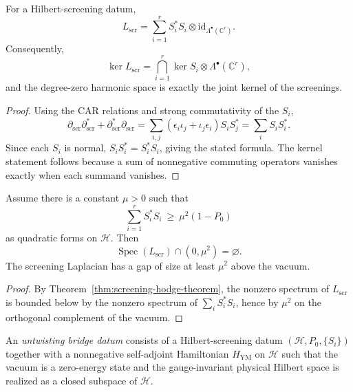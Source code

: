 \begin{theorem}
\label{thm:screening-hodge-theorem}
For a Hilbert-screening datum,
\[
L_{\mathrm{scr}}=\sum_{i=1}^r S_i^*S_i\otimes \mathrm{id}_{\Lambda^{\bullet}(\mathbb C^r)}.
\]
Consequently,
\[
\ker L_{\mathrm{scr}} = \bigcap_{i=1}^r \ker S_i \otimes \Lambda^{\bullet}(\mathbb C^r),
\]
and the degree-zero harmonic space is exactly the joint kernel of the screenings.
\end{theorem}

\begin{proof}
Using the CAR relations and strong commutativity of the $S_i$,
\[
\partial_{\mathrm{scr}}\partial_{\mathrm{scr}}^*+\partial_{\mathrm{scr}}^*\partial_{\mathrm{scr}}
=
\sum_{i,j}(\epsilon_i\iota_j+\iota_j\epsilon_i)S_iS_j^*
=
\sum_i S_iS_i^*.
\]
Since each $S_i$ is normal, $S_iS_i^*=S_i^*S_i$, giving the stated formula. The kernel statement follows
because a sum of nonnegative commuting operators vanishes exactly when each summand vanishes.
\end{proof}

\begin{corollary}
\label{cor:screening-spectral-gap-criterion}
Assume there is a constant $\mu>0$ such that
\[
\sum_{i=1}^r S_i^*S_i\ \ge\ \mu^2(1-P_0)
\]
as quadratic forms on $\mathcal H$.
Then
\[
\operatorname{Spec}(L_{\mathrm{scr}})\cap (0,\mu^2)=\varnothing.
\]
The screening Laplacian has a gap of size at least $\mu^2$ above the vacuum.
\end{corollary}

\begin{proof}
By Theorem~\ref{thm:screening-hodge-theorem}, the nonzero spectrum of $L_{\mathrm{scr}}$ is bounded below by the
nonzero spectrum of $\sum_i S_i^*S_i$, hence by $\mu^2$ on the orthogonal complement of the vacuum.
\end{proof}

\begin{definition}
\label{def:untwisting-bridge-datum}
An \emph{untwisting bridge datum} consists of a Hilbert-screening datum $(\mathcal H,P_0,\{S_i\})$
together with a nonnegative self-adjoint Hamiltonian $H_{\mathrm{YM}}$ on $\mathcal H$ such that the vacuum
is a zero-energy state and the gauge-invariant physical Hilbert space is realized as a closed subspace of $\mathcal H$.
\end{definition}

